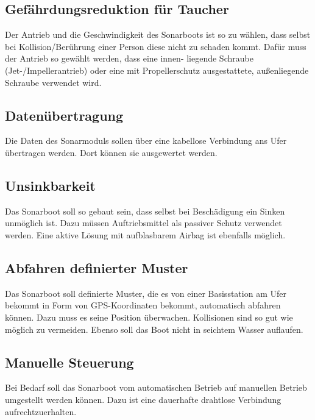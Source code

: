 \documentclass[a4paper]{article}
\begin{document}
\subsection{Gefährdungsreduktion für Taucher}

Der Antrieb und die Geschwindigkeit des Sonarboots ist so zu wählen, dass selbst bei Kollision/Berührung
einer Person diese nicht zu schaden kommt. Dafür muss der Antrieb so gewählt werden, dass eine innen-
liegende Schraube (Jet-/Impellerantrieb) oder eine mit Propellerschutz ausgestattete, außenliegende
Schraube verwendet wird.

\subsection{Datenübertragung}

Die Daten des Sonarmoduls sollen über eine kabellose Verbindung ans Ufer übertragen werden. Dort können
sie ausgewertet werden.

\subsection{Unsinkbarkeit}

Das Sonarboot soll so gebaut sein, dass selbst bei Beschädigung ein Sinken unmöglich ist. Dazu müssen
Auftriebsmittel als passiver Schutz verwendet werden. Eine aktive Lösung mit aufblasbarem Airbag ist
ebenfalls möglich.

\subsection{Abfahren definierter Muster}

Das Sonarboot soll definierte Muster, die es von einer Basisstation am Ufer bekommt in Form von 
GPS-Koordinaten bekommt, automatisch abfahren können. Dazu muss es seine Position überwachen.
Kollisionen sind so gut wie möglich zu vermeiden. Ebenso soll das Boot nicht in seichtem Wasser 
auflaufen.

\subsection{Manuelle Steuerung}

Bei Bedarf soll das Sonarboot vom automatischen Betrieb auf manuellen Betrieb umgestellt werden können.
Dazu ist eine dauerhafte drahtlose Verbindung aufrechtzuerhalten.
\end{document}
